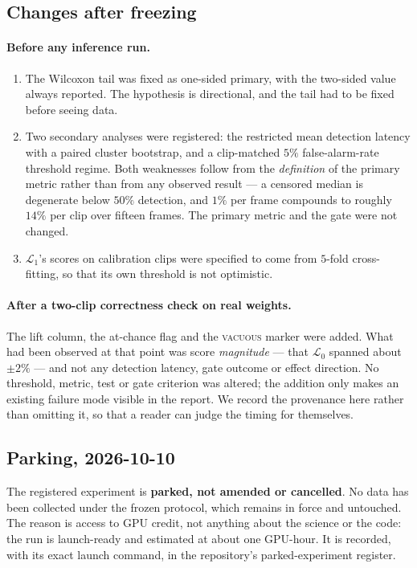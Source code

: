 \subsection{Changes after freezing}

\paragraph{Before any inference run.}
\begin{enumerate}
\item The Wilcoxon tail was fixed as one-sided primary, with the two-sided value
always reported. The hypothesis is directional, and the tail had to be fixed
before seeing data.
\item Two secondary analyses were registered: the restricted mean detection latency
with a paired cluster bootstrap, and a clip-matched $5\%$ false-alarm-rate
threshold regime. Both weaknesses follow from the \emph{definition} of the
primary metric rather than from any observed result --- a censored median is
degenerate below $50\%$ detection, and $1\%$ per frame compounds to roughly
$14\%$ per clip over fifteen frames. The primary metric and the gate were not
changed.
\item $\mathcal{L}_1$'s scores on calibration clips were specified to come from
$5$-fold cross-fitting, so that its own threshold is not optimistic.
\end{enumerate}

\paragraph{After a two-clip correctness check on real weights.}
The lift column, the at-chance flag and the \textsc{vacuous} marker were added.
What had been observed at that point was score \emph{magnitude} --- that
$\mathcal{L}_0$ spanned about $\pm2\%$ --- and not any detection latency, gate
outcome or effect direction. No threshold, metric, test or gate criterion was
altered; the addition only makes an existing failure mode visible in the report.
We record the provenance here rather than omitting it, so that a reader can
judge the timing for themselves.

\subsection{Parking, 2026-10-10}

The registered experiment is \textbf{parked, not amended or cancelled}. No data
has been collected under the frozen protocol, which remains in force and
untouched. The reason is access to GPU credit, not anything about the science or
the code: the run is launch-ready and estimated at about one GPU-hour. It is
recorded, with its exact launch command, in the repository's parked-experiment
register.

